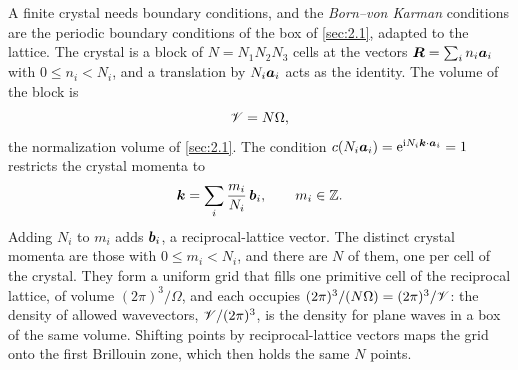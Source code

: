 A finite crystal needs boundary conditions, and the \emph{Born--von Karman} conditions are the periodic boundary conditions of the box of \cref{sec:2.1}, adapted to the lattice. The crystal is a block of $N = N_1N_2N_3$ cells at the vectors $\bm{R} = \sum_in_i\bm{a}_i$ with $0 \le n_i < N_i$, and a translation by $N_i\bm{a}_i$ acts as the identity. The volume of the block is
\begin{equation}
  \mathscr{V} = N\Omega ,
  \label{eq:3.1-V}
\end{equation}
the normalization volume of \cref{sec:2.1}. The condition $c(N_i\bm{a}_i) = \mathrm{e}^{\mathrm{i} N_i\bm{k}\cdot\bm{a}_i} = 1$ restricts the crystal momenta to
\begin{equation}
  \bm{k} = \sum_i\frac{m_i}{N_i}\,\bm{b}_i, \qquad m_i \in \mathbb{Z} .
  \label{eq:3.1-kgrid}
\end{equation}
Adding $N_i$ to $m_i$ adds $\bm{b}_i$, a reciprocal-lattice vector. The distinct crystal momenta are those with $0 \le m_i < N_i$, and there are $N$ of them, one per cell of the crystal. They form a uniform grid that fills one primitive cell of the reciprocal lattice, of volume $(2\pi)^3/\Omega$, and each occupies $(2\pi)^3/(N\Omega) = (2\pi)^3/\mathscr{V}$: the density of allowed wavevectors, $\mathscr{V}/(2\pi)^3$, is the density for plane waves in a box of the same volume. Shifting points by reciprocal-lattice vectors maps the grid onto the first Brillouin zone, which then holds the same $N$ points.

